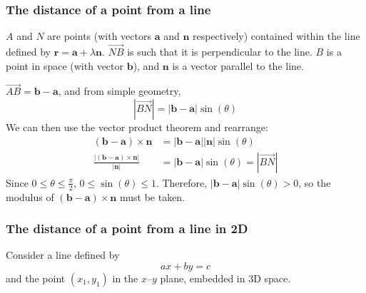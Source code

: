 \documentclass[11pt, a4paper]{article}
\begin{document}
\vspace{0.5cm}
\subsubsection*{The distance of a point from a line}
$A$ and $N$ are points (with vectors $\boldsymbol{a}$ and $\boldsymbol{n}$ respectively) contained within the line defined by $\boldsymbol{r}=\boldsymbol{a}+\lambda\boldsymbol{n}$. $\overrightarrow{NB}$ is such that it is perpendicular to the line. $B$ is a point in space (with vector $\boldsymbol{b}$), and $\boldsymbol{n}$ is a vector parallel to the line.
\begin{figure}[H]
\centering
{}
\end{figure}
$\overrightarrow{AB}=\boldsymbol{b}-\boldsymbol{a}$, and from simple geometry,
\begin{equation*}
\left|\overrightarrow{BN}\right|=|\boldsymbol{b}-\boldsymbol{a}|\sin(\theta)
\end{equation*}
We can then use the vector product theorem and rearrange:
\begin{align*}
(\boldsymbol{b}-\boldsymbol{a})\times\boldsymbol{n}&=|\boldsymbol{b}-\boldsymbol{a}||\boldsymbol{n}|\sin(\theta) \\
\frac{\left| (\boldsymbol{b}-\boldsymbol{a})\times\boldsymbol{n} \right|}{|\boldsymbol{n}|}&=|\boldsymbol{b}-\boldsymbol{a}|\sin(\theta)=\left|\overrightarrow{BN}\right|
\end{align*}
\scriptsize
Since $0\leq\theta\leq\frac{\pi}{2}$, $0\leq\sin(\theta)\leq1$. Therefore, $|\boldsymbol{b}-\boldsymbol{a}|\sin(\theta)>0$, so the modulus of $(\boldsymbol{b}-\boldsymbol{a})\times\boldsymbol{n}$ must be taken.
\normalsize

\subsubsection*{The distance of a point from a line in 2D}
Consider a line defined by
\begin{equation*}
ax+by=c
\end{equation*}
and the point $(x_{1},y_{1})$ in the $x$--$y$ plane, embedded in 3D space. \newline \par
\end{document}
